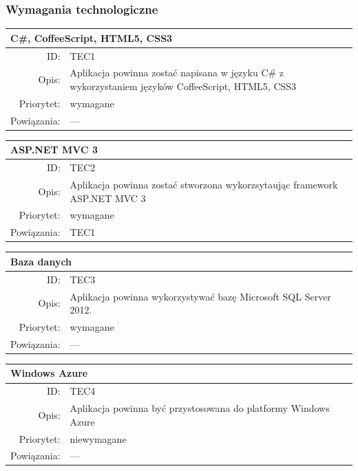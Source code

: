 \subsubsection{Wymagania technologiczne}
      \begin{center}
      \begin{tabular}{rp{10cm}}
        \multicolumn{2}{l}{\textbf{C\#, CoffeeScript, HTML5, CSS3}} \\
        \hline
        ID: & TEC1 \\
        Opis: & Aplikacja powinna zostać napisana w języku C\# z wykorzystaniem języków CoffeeScript, HTML5, CSS3 \\
        Priorytet: & wymagane \\
        Powiązania: & --- \\
      \end{tabular}
      \end{center}

      \begin{center}
      \begin{tabular}{rp{10cm}}
        \multicolumn{2}{l}{\textbf{ASP.NET MVC 3}} \\
        \hline
        ID: & TEC2 \\
        Opis: & Aplikacja powinna zostać stworzona wykorzsytaując framework ASP.NET MVC 3 \\
        Priorytet: & wymagane \\
        Powiązania: & TEC1 \\
      \end{tabular}
      \end{center}



      \begin{center}
      \begin{tabular}{rp{10cm}}
        \multicolumn{2}{l}{\textbf{Baza danych}} \\
        \hline
        ID: & TEC3 \\
        Opis: & Aplikacja powinna wykorzystywać bazę Microsoft SQL Server 2012. \\
        Priorytet: & wymagane \\
        Powiązania: & --- \\
      \end{tabular}
      \end{center}



      \begin{center}
      \begin{tabular}{rp{10cm}}
        \multicolumn{2}{l}{\textbf{Windows Azure}} \\
        \hline
        ID: & TEC4 \\
        Opis: & Aplikacja powinna być przystosowana do platformy Windows Azure \\
        Priorytet: & niewymagane \\
        Powiązania: & --- \\
      \end{tabular}
      \end{center}

